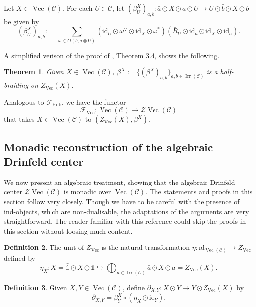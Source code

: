 \documentclass[a4paper,11pt,reqno]{amsart}
\numberwithin{equation}{section}
\newtheorem{theorem}{Theorem}[section]
\theoremstyle{remark}
\newtheorem{remark}[theorem]{Remark}
\theoremstyle{definition}
\newtheorem{definition}[theorem]{Definition}
\newcommand{\cC}{\mathcal C}
\newcommand{\cF}{\mathcal F}
\newcommand{\cZ}{\mathcal Z}
\DeclareMathOperator{\Irr}{Irr}
\DeclareMathOperator{\Vect}{Vec}
\newcommand\un{{\mathds 1}}
\newcommand{\id}{\mathrm{id}}
\newcommand{\Hilb}{\mathrm{Hilb}}
\begin{document}
Let $X \in \Vect(\cC)$. For each $U \in \cC$, let $(\beta^X_U)_{a,b}: \bar{a} \odot X \odot a \odot U \to U \odot \bar{b} \odot X \odot b$ be given by
\[
(\beta^X_U)_{a,b} : =  \sum_{\omega \in O(b,a \otimes U)} (\id_U \odot\omega^\vee \odot \id_X\odot \omega^*) (\bar{R}_U \odot \id_{\bar{a}} \odot \id_X \odot \id_{a}).
\]

A simplified verison of the proof of \cite{MR3509018}, Theorem 3.4, shows the following.

\begin{theorem}
	Given $X \in \Vect(\cC)$, $\beta^X := \{ (\beta^X)_{a,b}\}_{a,b \in \Irr(\cC)}$ is a  half-braiding on $Z_{\Vect}(X)$.
	\label{thm:algfreehalfbraiding}
\end{theorem}

Analogous to $\cF_{\Hilb}$, we have the functor 
\[
\cF_{\Vect}: \Vect(\cC) \to \cZ \Vect(\cC)
\]
that takes $X \in \Vect(\cC)$ to $(Z_{\Vect}(X),\beta^X)$.



\subsection{Monadic reconstruction of the algebraic Drinfeld center}

We  now present an algebraic treatment, showing that the algebraic Drinfeld center $\cZ \Vect(\cC)$ is monadic over $\Vect(\cC)$. The statements and proofs in this section follow \cite{MR3674995} very closely. Though we have to be careful with the presence of ind-objects, which are non-dualizable, the adaptations of the arguments are very straightforward. The reader familiar with this reference could skip the proofs in this section without loosing much content.

\begin{definition}
	The unit of $Z_{\Vect}$ is the natural transformation $\eta: \id_{\Vect(\cC)} \to Z_{\Vect}$ defined by 
	\[
	\eta_X: X = \bar{\un} \odot X \odot \un \hookrightarrow \bigoplus_{a \in \Irr(\cC)} \bar{a} \odot X \odot a= Z_{\Vect}(X) .
	\]
\end{definition}

\begin{definition}
	Given $X,Y \in \Vect(\cC)$, define $\partial_{X,Y}: X \odot Y \to Y \odot Z_{\Vect}(X)$ by
	\[
	\partial_{X,Y} = \beta^X_Y \circ (\eta_X \odot \id_Y) .
	\]
\end{definition}
\end{document}

